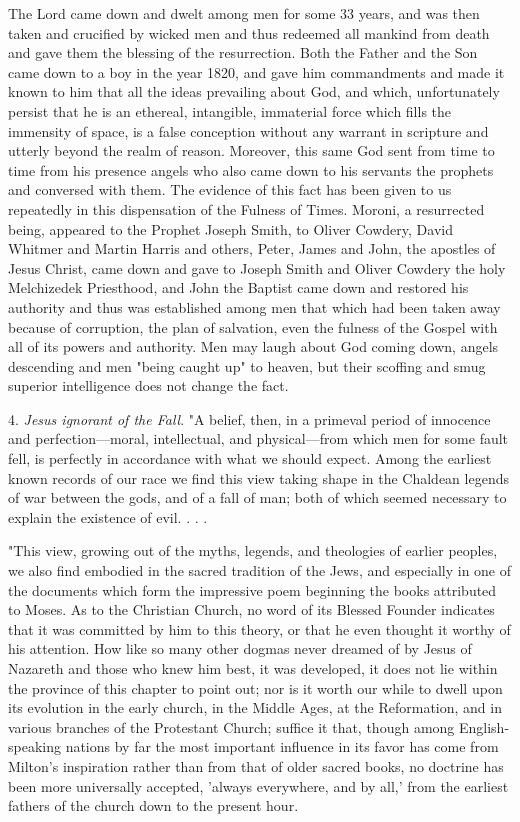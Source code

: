 The Lord came down and dwelt among men for some 33 years, and was then taken and
crucified by wicked men and thus redeemed all mankind from death and gave them the
blessing of the resurrection. Both the Father and the Son came down to a boy in the year
1820, and gave him commandments and made it known to him that all the ideas prevailing
about God, and which, unfortunately persist that he is an ethereal, intangible, immaterial
force which fills the immensity of space, is a false conception without any warrant in
scripture and utterly beyond the realm of reason. Moreover, this same God sent from time to
time from his presence angels who also came down to his servants the prophets and
conversed with them. The evidence of this fact has been given to us repeatedly in this
dispensation of the Fulness of Times. Moroni, a resurrected being, appeared to the Prophet
Joseph Smith, to Oliver Cowdery, David Whitmer and Martin Harris and others, Peter, James
and John, the apostles of Jesus Christ, came down and gave to Joseph Smith and Oliver
Cowdery the holy Melchizedek Priesthood, and John the Baptist came down and restored his
authority and thus was established among men that which had been taken away because of
corruption, the plan of salvation, even the fulness of the Gospel with all of its powers and
authority. Men may laugh about God coming down, angels descending and men "being
caught up" to heaven, but their scoffing and smug superior intelligence does not change the
fact.

4. \textit{Jesus ignorant of the Fall}. "A belief, then, in a primeval period of innocence and
perfection—moral, intellectual, and physical—from which men for some fault fell, is
perfectly in accordance with what we should expect. Among the earliest known records of
our race we find this view taking shape in the Chaldean legends of war between the gods, and
of a fall of man; both of which seemed necessary to explain the existence of evil. . . .

"This view, growing out of the myths, legends, and theologies of earlier peoples, we also find
embodied in the sacred tradition of the Jews, and especially in one of the documents which
form the impressive poem beginning the books attributed to Moses. As to the Christian
Church, no word of its Blessed Founder indicates that it was committed by him to this theory,
or that he even thought it worthy of his attention. How like so many other dogmas never
dreamed of by Jesus of Nazareth and those who knew him best, it was developed, it does not
lie within the province of this chapter to point out; nor is it worth our while to dwell upon its
evolution in the early church, in the Middle Ages, at the Reformation, and in various
branches of the Protestant Church; suffice it that, though among English-speaking nations by
far the most important influence in its favor has come from Milton's inspiration rather than
from that of older sacred books, no doctrine has been more universally accepted, 'always
everywhere, and by all,' from the earliest fathers of the church down to the present hour.

